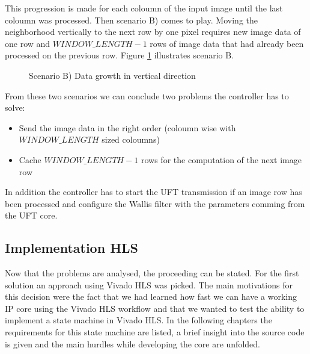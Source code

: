 This progression is made for each coloumn of the input image until the last
coloumn was processed. Then scenario B) comes to play. Moving the neighborhood
vertically to the next row by one pixel requires new image data of one row
and $WINDOW\_LENGTH-1$ rows of image data that had already been processed on the
previous row. Figure \ref{fig:memproblemgrowthy} illustrates scenario B.

\begin{figure}[H]
    \centering
    \begin{adjustbox}{scale=0.7}
        
    \end{adjustbox}
    \caption{Scenario B) Data growth in vertical direction}
    \label{fig:memproblemgrowthy}
\end{figure}

From these two scenarios we can conclude two problems the controller has to
solve:
\begin{itemize}
    \item Send the image data in the right order (coloumn wise with
    $WINDOW\_LENGTH$ sized coloumns)
    \item Cache $WINDOW\_LENGTH-1$ rows for the computation of the next image
    row
\end{itemize}

In addition the controller has to start the UFT transmission if an image row has
been processed and configure the Wallis filter with the parameters comming from
the UFT core.

\clearpage

\subsection{Implementation HLS} \label{ch:controller:hls}
Now that the problems are analysed, the proceeding can be stated. For the first
solution an approach using Vivado HLS was picked. The main motivations for this
decision were the fact that we had learned how fast we can have a working IP
core
using the Vivado HLS workflow and that we wanted to test the ability to
implement a state machine in Vivado HLS. In the following chapters the
requirements for this state machine are listed, a brief insight into the source
code is given and the main hurdles while developing the core are unfolded.

